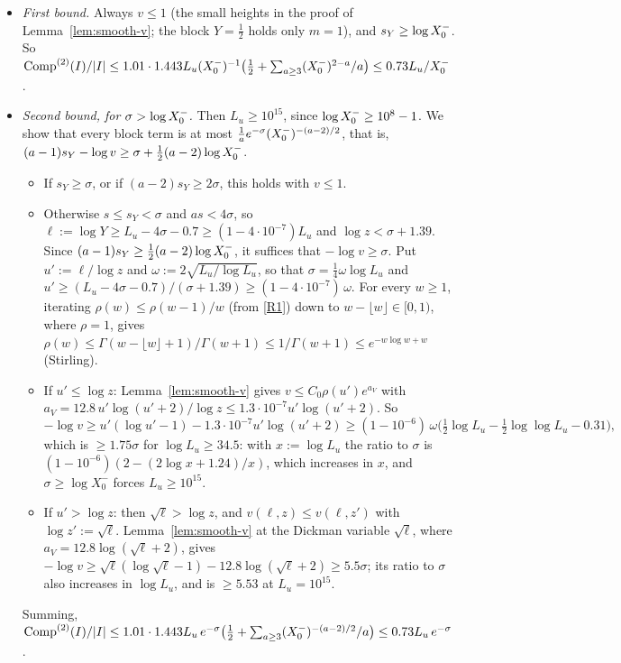 \begin{itemize}
  Lemma~\ref{lem:smooth-v}.
\item \emph{First bound.} Always $v\le1$ (the small heights in the proof of Lemma~\ref{lem:smooth-v}; the block $Y=\frac12$
  holds only $m=1$), and $s_Y\ge\log X_0^{-}$. So
  $\mathrm{Comp}^{(2)}(I)/|I|\le1.01\cdot1.443L_u(X_0^{-})^{-1}\bigl(\frac12+\sum_{a\ge3}(X_0^{-})^{2-a}/a\bigr)\le0.73L_u/X_0^{-}$.
\item \emph{Second bound, for $\sigma>\log X_0^{-}$.} Then $L_u\ge10^{15}$, since $\log X_0^{-}\ge10^8-1$. We show that every block term
  is at most $\frac1ae^{-\sigma}(X_0^{-})^{-(a-2)/2}$, that is, $(a-1)s_Y-\log v\ge\sigma+\frac12(a-2)\log X_0^{-}$.
  \begin{itemize}
  \item If $s_Y\ge\sigma$, or if $(a-2)s_Y\ge2\sigma$, this holds with $v\le1$.
  \item Otherwise $s\le s_Y<\sigma$ and $as<4\sigma$, so $\ell:=\log Y\ge L_u-4\sigma-0.7\ge(1-4\cdot10^{-7})L_u$ and
    $\log z<\sigma+1.39$. Since $(a-1)s_Y\ge\frac12(a-2)\log X_0^{-}$, it suffices that $-\log v\ge\sigma$. Put $u':=\ell/\log z$
    and $\omega:=2\sqrt{L_u/\log L_u}$, so that $\sigma=\frac14\omega\log L_u$ and
    $u'\ge(L_u-4\sigma-0.7)/(\sigma+1.39)\ge(1-4\cdot10^{-7})\,\omega$. For every $w\ge1$, iterating $\rho(w)\le\rho(w-1)/w$
    (from \ref{R1}) down to $w-\lfloor w\rfloor\in[0,1)$, where $\rho=1$, gives
    $\rho(w)\le\Gamma(w-\lfloor w\rfloor+1)/\Gamma(w+1)\le1/\Gamma(w+1)\le e^{-w\log w+w}$ (Stirling).
  \item If $u'\le\log z$: Lemma~\ref{lem:smooth-v} gives $v\le C_0\rho(u')e^{a_V}$ with
    $a_V=12.8\,u'\log(u'+2)/\log z\le1.3\cdot10^{-7}u'\log(u'+2)$. So
    \[
      -\log v\ge u'(\log u'-1)-1.3\cdot10^{-7}u'\log(u'+2)\ge(1-10^{-6})\,\omega\bigl(\tfrac12\log L_u-\tfrac12\log\log L_u-0.31\bigr),
    \]
    which is $\ge1.75\sigma$ for $\log L_u\ge34.5$: with $x:=\log L_u$ the ratio to $\sigma$ is $(1-10^{-6})(2-(2\log x+1.24)/x)$,
    which increases in $x$, and $\sigma\ge\log X_0^-$ forces $L_u\ge10^{15}$.
  \item If $u'>\log z$: then $\sqrt\ell>\log z$, and $v(\ell,z)\le v(\ell,z')$ with $\log z':=\sqrt\ell$. Lemma~\ref{lem:smooth-v} at
    the Dickman variable $\sqrt\ell$, where $a_V=12.8\log(\sqrt\ell+2)$, gives
    $-\log v\ge\sqrt\ell(\log\sqrt\ell-1)-12.8\log(\sqrt\ell+2)\ge5.5\sigma$; its ratio to $\sigma$ also increases in $\log L_u$, and
    is $\ge5.53$ at $L_u=10^{15}$.
  \end{itemize}
  Summing, $\mathrm{Comp}^{(2)}(I)/|I|\le1.01\cdot1.443L_u\,e^{-\sigma}\bigl(\frac12+\sum_{a\ge3}(X_0^{-})^{-(a-2)/2}/a\bigr)\le0.73L_u\,e^{-\sigma}$.

\end{itemize}
